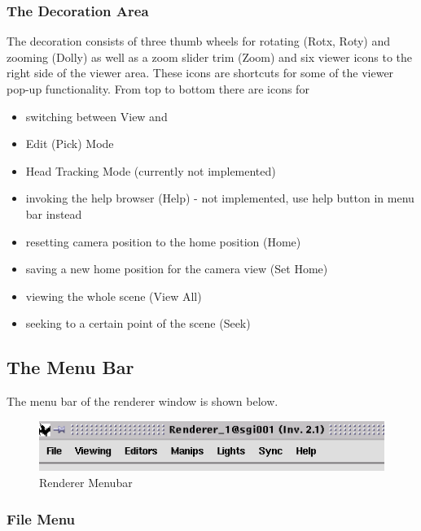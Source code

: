\clearpage

\subsubsection{The Decoration Area}

The decoration consists of three thumb wheels for rotating (Rotx, Roty) and
zooming (Dolly) as well as a zoom slider trim (Zoom) and six viewer icons to
the right side of the viewer area. These icons are shortcuts for some of the
viewer pop-up functionality. From top to bottom there are icons for 

\begin{itemize}
\item switching between View and 
\item Edit (Pick) Mode
\item Head Tracking Mode (currently not implemented)
\item invoking the help browser (Help) - not implemented, use help button in menu bar instead
\item resetting camera position to the home position (Home)
\item saving a new home position for the camera view (Set Home)
\item viewing the whole scene (View All)
\item seeking to a certain point of the scene (Seek)
\end{itemize}

\clearpage

\subsection{The Menu Bar}

The menu bar of the renderer window is shown below.

 \latexonly
 \begin{figure}[htp]
  \begin{center}
   \includegraphics[scale=0.7]{renderer/pict/menubar}
   \caption{Renderer Menubar}
	\label{fig58}
  \end{center}
 \end{figure}
 \endlatexonly

\subsubsection{File Menu}

